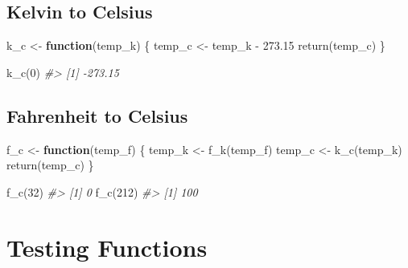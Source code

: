 \documentclass[
]{book}
\newenvironment{Shaded}{\begin{snugshade}}{\end{snugshade}}
\newcommand{\CommentTok}[1]{\textcolor[rgb]{0.56,0.35,0.01}{\textit{#1}}}
\newcommand{\ControlFlowTok}[1]{\textcolor[rgb]{0.13,0.29,0.53}{\textbf{#1}}}
\newcommand{\DecValTok}[1]{\textcolor[rgb]{0.00,0.00,0.81}{#1}}
\newcommand{\FloatTok}[1]{\textcolor[rgb]{0.00,0.00,0.81}{#1}}
\newcommand{\FunctionTok}[1]{\textcolor[rgb]{0.00,0.00,0.00}{#1}}
\newcommand{\NormalTok}[1]{#1}
\newcommand{\OtherTok}[1]{\textcolor[rgb]{0.56,0.35,0.01}{#1}}
\newcommand{\SpecialCharTok}[1]{\textcolor[rgb]{0.00,0.00,0.00}{#1}}
\begin{document}
\hypertarget{kelvin-to-celsius}{%
\subsection{Kelvin to Celsius}\label{kelvin-to-celsius}}

\begin{Shaded}
\begin{Highlighting}[]
\NormalTok{k\_c }\OtherTok{\textless{}{-}} \ControlFlowTok{function}\NormalTok{(temp\_k) \{}
\NormalTok{    temp\_c }\OtherTok{\textless{}{-}}\NormalTok{ temp\_k }\SpecialCharTok{{-}} \FloatTok{273.15}
    \FunctionTok{return}\NormalTok{(temp\_c)}
\NormalTok{\}}
\end{Highlighting}
\end{Shaded}

\begin{Shaded}
\begin{Highlighting}[]
\FunctionTok{k\_c}\NormalTok{(}\DecValTok{0}\NormalTok{)}
\CommentTok{\#\textgreater{} [1] {-}273.15}
\end{Highlighting}
\end{Shaded}

\hypertarget{fahrenheit-to-celsius}{%
\subsection{Fahrenheit to Celsius}\label{fahrenheit-to-celsius}}

\begin{Shaded}
\begin{Highlighting}[]
\NormalTok{f\_c }\OtherTok{\textless{}{-}} \ControlFlowTok{function}\NormalTok{(temp\_f) \{}
\NormalTok{    temp\_k }\OtherTok{\textless{}{-}} \FunctionTok{f\_k}\NormalTok{(temp\_f)}
\NormalTok{    temp\_c }\OtherTok{\textless{}{-}} \FunctionTok{k\_c}\NormalTok{(temp\_k)}
    \FunctionTok{return}\NormalTok{(temp\_c)}
\NormalTok{\}}
\end{Highlighting}
\end{Shaded}

\begin{Shaded}
\begin{Highlighting}[]
\FunctionTok{f\_c}\NormalTok{(}\DecValTok{32}\NormalTok{)}
\CommentTok{\#\textgreater{} [1] 0}
\FunctionTok{f\_c}\NormalTok{(}\DecValTok{212}\NormalTok{)}
\CommentTok{\#\textgreater{} [1] 100}
\end{Highlighting}
\end{Shaded}

\hypertarget{testing-functions}{%
\section{Testing Functions}\label{testing-functions}}
\end{document}
